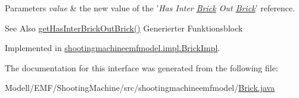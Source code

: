\begin{DoxyParams}{Parameters}
{\em value} & the new value of the '{\itshape Has Inter \hyperlink{interfaceshootingmachineemfmodel_1_1_brick}{Brick} Out \hyperlink{interfaceshootingmachineemfmodel_1_1_brick}{Brick}}' reference. \\
\hline
\end{DoxyParams}
\begin{DoxySeeAlso}{See Also}
\hyperlink{interfaceshootingmachineemfmodel_1_1_brick_a5af63cdf69e6685ff67377e4ab4d8745}{get\-Has\-Inter\-Brick\-Out\-Brick()} Generierter Funktionsblock 
\end{DoxySeeAlso}


Implemented in \hyperlink{classshootingmachineemfmodel_1_1impl_1_1_brick_impl_a50ea2727f2d9e690aaa08d9cd1e6e603}{shootingmachineemfmodel.\-impl.\-Brick\-Impl}.



The documentation for this interface was generated from the following file\-:\begin{DoxyCompactItemize}
\item 
Modell/\-E\-M\-F/\-Shooting\-Machine/src/shootingmachineemfmodel/\hyperlink{_brick_8java}{Brick.\-java}\end{DoxyCompactItemize}
